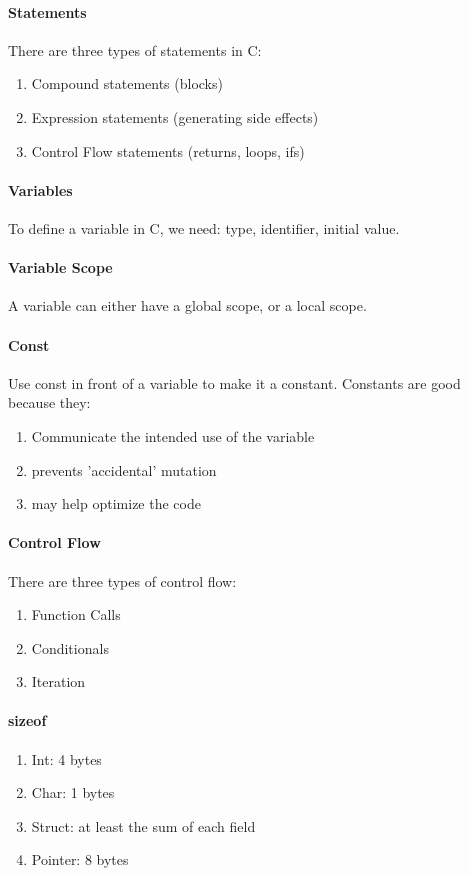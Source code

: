 \documentclass[10pt,letter]{article}
\begin{document}
\paragraph{Statements} There are three types of statements in C: \begin{enumerate}
    \item Compound statements (blocks)
    \item Expression statements (generating side effects)
    \item Control Flow statements (returns, loops, ifs)
\end{enumerate}

\paragraph{Variables} To define a variable in C, we need: type, identifier, initial value. 

\paragraph{Variable Scope} A variable can either have a global scope, or a local scope. 

\paragraph{Const} Use const in front of a variable to make it a constant. Constants are good because they: \begin{enumerate}
    \item Communicate the intended use of the variable
    \item prevents 'accidental' mutation
    \item may help optimize the code
\end{enumerate}

\paragraph{Control Flow} There are three types of control flow:
\begin{enumerate}
    \item Function Calls
    \item Conditionals
    \item Iteration
\end{enumerate}

\paragraph{sizeof} \begin{enumerate}
    \item Int: 4 bytes
    \item Char: 1 bytes
    \item Struct: at least the sum of each field
    \item Pointer: 8 bytes
\end{enumerate}
\end{document}
